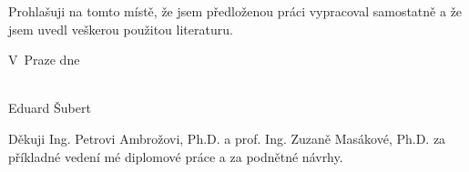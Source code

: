 \documentclass[a4paper,10pt,twoside]{report}
\theoremstyle{remark}
\begin{document}
\clearpage
\thispagestyle{empty}
\cleardoublepage

\thispagestyle{empty}



\vspace{0.5cm}

Prohlašuji na tomto místě, že jsem předloženou práci vypracoval samostatně 
a že jsem uvedl veškerou použitou literaturu.

\vspace{1.5cm}

\noindent
\begin{minipage}[b]{5cm}
V~Praze dne 
\end{minipage}
\hfill
\begin{minipage}[t]{5cm}
\begin{center}
\dotfill\\
Eduard Šubert
\end{center}
\end{minipage}

\vspace*{2cm}


\clearpage
\thispagestyle{empty}
\cleardoublepage

\thispagestyle{empty}


Děkuji Ing. Petrovi Ambrožovi, Ph.D. a prof. Ing. Zuzaně Masákové, Ph.D. za příkladné vedení mé diplomové práce a za podnětné návrhy. 

\vspace*{2cm}


\clearpage
\thispagestyle{empty}
\cleardoublepage

\thispagestyle{empty}
\end{document}
